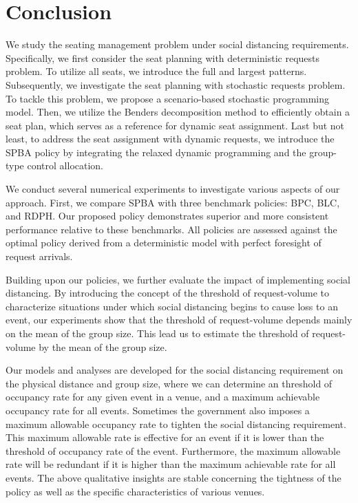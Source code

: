 \section{Conclusion}\label{sec_conclusion}
We study the seating management problem under social distancing requirements. Specifically, we first consider the seat planning with deterministic requests problem. To utilize all seats, we introduce the full and largest patterns. Subsequently, we investigate the seat planning with stochastic requests problem. To tackle this problem, we propose a scenario-based stochastic programming model. Then, we utilize the Benders decomposition method to efficiently obtain a seat plan, which serves as a reference for dynamic seat assignment. Last but not least, to address the seat assignment with dynamic requests, we introduce the SPBA policy by integrating the relaxed dynamic programming and the group-type control allocation.

We conduct several numerical experiments to investigate various aspects of our approach. First, we compare SPBA with three benchmark policies: BPC, BLC, and RDPH. Our proposed policy demonstrates superior and more consistent performance relative to these benchmarks. All policies are assessed against the optimal policy derived from a deterministic model with perfect foresight of request arrivals.


Building upon our policies, we further evaluate the impact of implementing social distancing. By introducing the concept of the threshold of request-volume to characterize situations under which social distancing begins to cause loss to an event, our experiments show that the threshold of request-volume depends mainly on the mean of the group size. This lead us to estimate the threshold of request-volume by the mean of the group size.


Our models and analyses are developed for the social distancing requirement on the physical distance and group size, where we can determine an threshold of occupancy rate for any given event in a venue, and a maximum achievable occupancy rate for all events. Sometimes the government also imposes a maximum allowable occupancy rate to tighten the social distancing requirement. This maximum allowable rate is effective for an event if it is lower than the threshold of occupancy rate of the event. Furthermore, the maximum allowable rate will be redundant if it is higher than the maximum achievable rate for all events. The above qualitative insights are stable concerning the tightness of the policy as well as the specific characteristics of various venues.


